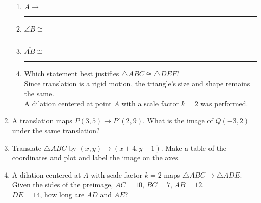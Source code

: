 \documentclass[12pt, twoside]{article}
\begin{document}
\begin{enumerate}
\begin{multicols}{2}
      \begin{enumerate}
        \item $A \rightarrow$ \rule{2cm}{0.15mm}
        \item $\angle B \cong$ \rule{2cm}{0.15mm}
        \item $\overline {AB} \cong$ \rule{2cm}{0.15mm}
        \item Which statement best justifies $\triangle ABC \cong \triangle DEF$? \\[0.5cm]
        Since translation is a rigid motion, the triangle's size and shape remains the same.\\[0.5cm]
        A dilation centered at point $A$ with a scale factor $k=2$ was performed.
      \end{enumerate}
    \end{multicols}

\newpage
\item A translation maps $P(3,5) \rightarrow P'(2,9)$. What is the image of $Q(-3,2)$ under the same translation?

\newpage
\item Translate $\triangle ABC$ by $(x,y) \rightarrow (x+4, y-1)$. Make a table of the coordinates and plot and label the image on the axes.
  \begin{flushright}
  \end{flushright}

\newpage
\item A dilation centered at $A$ with scale factor $k=2$ maps $\triangle ABC \rightarrow \triangle ADE$. Given the sides of the preimage, $AC = 10$, $BC = 7$, $AB = 12$. \\[0.5cm]
$DE = 14$, how long are $AD$ and $AE$?
    \begin{flushright}
    \end{flushright}


\end{enumerate}
\end{document}
